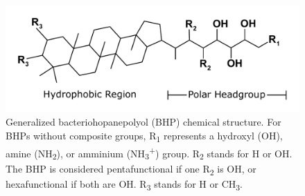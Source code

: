 \begin{landscape}
\begin{table}
\begin{adjustbox}{width=600pt,keepaspectratio}
\begin{threeparttable}
\begin{tablenotes}
        
  \end{tablenotes}
  
  \label{tab:BHP_redox_table}
  \end{threeparttable}
  \end{adjustbox}
\end{table}

\doublespace
\end{landscape}
\setcounter{tabcounter}{0} %




\singlespace
\begin{figure}[h]
\centering
\includegraphics[width=1\linewidth]{figs_ch3/BHP_structure_general.pdf}
\caption[Generalized bacteriohopanepolyol chemical structure]{Generalized bacteriohopanepolyol (BHP) chemical structure. For BHPs without composite groups, R\textsubscript{1} represents a hydroxyl (OH), amine (NH\textsubscript{2}), or amminium (NH\textsubscript{3}\textsuperscript{+}) group. R\textsubscript{2} stands for H or OH. The BHP is considered pentafunctional if one R\textsubscript{2} is OH, or hexafunctional if both are OH. R\textsubscript{3} stands for H or CH\textsubscript{3}.}
\label{fig:BHP_structure}
\end{figure}
\doublespace




